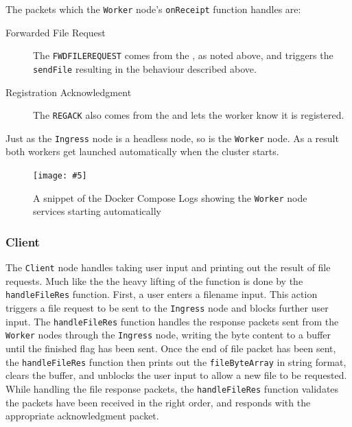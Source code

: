 \documentclass{article}
\newcommand{\includescalefigure}[5]{
\begin{figure}[htb]
\centering
\texttt{[image: \#5]}
\captionsetup{width=.8\linewidth} 
\caption[#2]{#3}
\label{#1}
\end{figure}
}
\newcommand{\code}[1]{\texttt{#1}}
\begin{document}

The packets which the \code{Worker} node's \code{onReceipt} function handles are:
\begin{description}
	\item[Forwarded File Request] The \code{FWDFILEREQUEST} comes from the \code{}, as noted above, and triggers the \code{sendFile} resulting in the behaviour described above.
	\item[Registration Acknowledgment] The \code{REGACK} also comes from the \code{} and lets the worker know it is registered.
\end{description}
Just as the \code{Ingress} node is a headless node, so is the \code{Worker} node. As a result both workers get launched automatically when the cluster starts.
\includescalefigure{fig:worker_start_log}{Start log of \code{Worker} nodes}{A snippet of the Docker Compose Logs showing the \code{Worker} node services starting automatically}{1}{worker_start_log.png}

\subsubsection{Client}
\label{subsec:Client}
The \code{Client} node handles taking user input and printing out the result of file requests. Much like the \code{} the heavy lifting of the function is done by the \code{handleFileRes} function. First, a user enters a filename input. This action triggers a file request to be sent to the \code{Ingress} node and blocks further user input. The \code{handleFileRes} function handles the response packets sent from the \code{Worker} nodes through the \code{Ingress} node, writing the byte content to a buffer until the finished flag has been sent. Once the end of file packet has been sent, the \code{handleFileRes} function then prints out the \code{fileByteArray} in string format, clears the buffer, and unblocks the user input to allow a new file to be requested. While handling the file response packets, the \code{handleFileRes} function validates the packets have been received in the right order, and responds with the appropriate acknowledgment packet.
\end{document}
